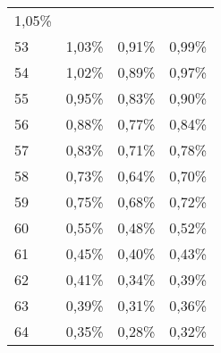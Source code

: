 \begin{tabular}{llll}
  \multicolumn{1}{r}{1,05\%} \\
\multicolumn{1}{l}{\hspace{1em}53} &
  \multicolumn{1}{|r}{1,03\%} &
  \multicolumn{1}{r}{0,91\%} &
  \multicolumn{1}{r}{0,99\%} \\
\multicolumn{1}{l}{\hspace{1em}54} &
  \multicolumn{1}{|r}{1,02\%} &
  \multicolumn{1}{r}{0,89\%} &
  \multicolumn{1}{r}{0,97\%} \\
\multicolumn{1}{l}{\hspace{1em}55} &
  \multicolumn{1}{|r}{0,95\%} &
  \multicolumn{1}{r}{0,83\%} &
  \multicolumn{1}{r}{0,90\%} \\
\multicolumn{1}{l}{\hspace{1em}56} &
  \multicolumn{1}{|r}{0,88\%} &
  \multicolumn{1}{r}{0,77\%} &
  \multicolumn{1}{r}{0,84\%} \\
\multicolumn{1}{l}{\hspace{1em}57} &
  \multicolumn{1}{|r}{0,83\%} &
  \multicolumn{1}{r}{0,71\%} &
  \multicolumn{1}{r}{0,78\%} \\
\multicolumn{1}{l}{\hspace{1em}58} &
  \multicolumn{1}{|r}{0,73\%} &
  \multicolumn{1}{r}{0,64\%} &
  \multicolumn{1}{r}{0,70\%} \\
\multicolumn{1}{l}{\hspace{1em}59} &
  \multicolumn{1}{|r}{0,75\%} &
  \multicolumn{1}{r}{0,68\%} &
  \multicolumn{1}{r}{0,72\%} \\
\multicolumn{1}{l}{\hspace{1em}60} &
  \multicolumn{1}{|r}{0,55\%} &
  \multicolumn{1}{r}{0,48\%} &
  \multicolumn{1}{r}{0,52\%} \\
\multicolumn{1}{l}{\hspace{1em}61} &
  \multicolumn{1}{|r}{0,45\%} &
  \multicolumn{1}{r}{0,40\%} &
  \multicolumn{1}{r}{0,43\%} \\
\multicolumn{1}{l}{\hspace{1em}62} &
  \multicolumn{1}{|r}{0,41\%} &
  \multicolumn{1}{r}{0,34\%} &
  \multicolumn{1}{r}{0,39\%} \\
\multicolumn{1}{l}{\hspace{1em}63} &
  \multicolumn{1}{|r}{0,39\%} &
  \multicolumn{1}{r}{0,31\%} &
  \multicolumn{1}{r}{0,36\%} \\
\multicolumn{1}{l}{\hspace{1em}64} &
  \multicolumn{1}{|r}{0,35\%} &
  \multicolumn{1}{r}{0,28\%} &
  \multicolumn{1}{r}{0,32\%} \\

\end{tabular}
